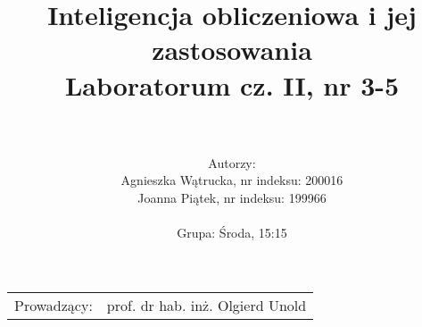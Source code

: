 \documentclass{article}
\title{Inteligencja obliczeniowa i jej zastosowania\\
	\vspace{5mm}
	\textbf{Laboratorum cz. II, nr 3-5}} %
\author{\\
	\\Autorzy:
	\\Agnieszka Wątrucka, nr indeksu: 200016
	\\Joanna Piątek, nr indeksu: 199966
	\\
	\\Grupa: Środa, 15:15} %
\begin{document}
\maketitle %

\begin{center}
\begin{tabular}{l r}
Prowadzący: & prof. dr hab. inż. Olgierd Unold %
\end{tabular}
\end{center}
 
\newpage
\tableofcontents 	%
\newpage



\newpage
\end{document}
